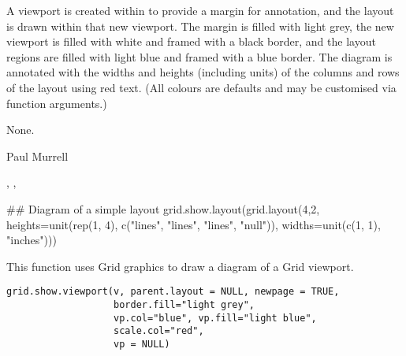%
\begin{Details}\relax
A viewport is created within  to provide a margin for
annotation, and the layout is drawn within that new viewport.
The margin is filled with light grey, the new viewport is filled
with white and framed with a black border, and the layout regions
are filled with light blue and framed with a blue border.
The diagram is annotated with the widths and heights (including units)
of the columns and rows of the layout using red text. (All colours
are defaults and may be customised via function arguments.)
\end{Details}
%
\begin{Value}
None.
\end{Value}
%
\begin{Author}\relax
Paul Murrell
\end{Author}
%
\begin{SeeAlso}\relax
{},
,
\end{SeeAlso}
%
\begin{Examples}
\begin{ExampleCode}
## Diagram of a simple layout 
grid.show.layout(grid.layout(4,2,
                     heights=unit(rep(1, 4),
                                  c("lines", "lines", "lines", "null")),
                     widths=unit(c(1, 1), "inches")))
\end{ExampleCode}
\end{Examples}
%
\begin{Description}\relax
This function uses Grid graphics to draw a diagram of
a Grid viewport.
\end{Description}
%
\begin{Usage}
\begin{verbatim}
grid.show.viewport(v, parent.layout = NULL, newpage = TRUE,
                   border.fill="light grey",
                   vp.col="blue", vp.fill="light blue",
                   scale.col="red",
                   vp = NULL)
\end{verbatim}
\end{Usage}
%
